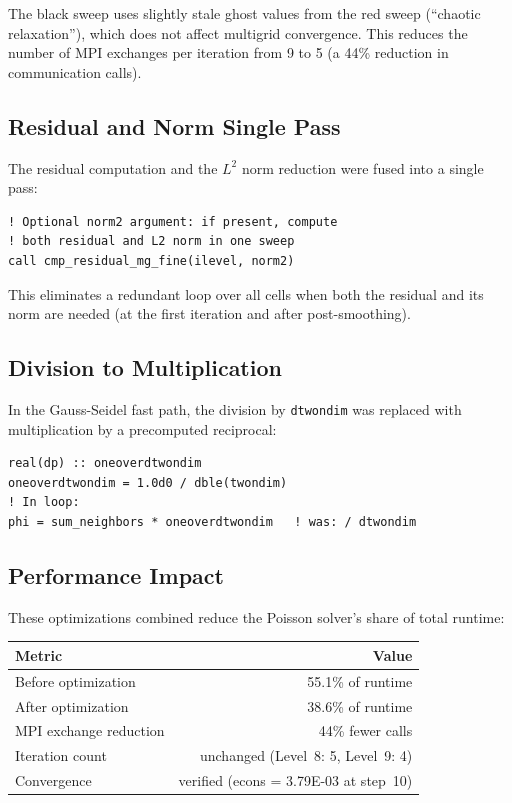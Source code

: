 \documentclass[11pt,fleqn]{book}
\begin{document}
The black sweep uses slightly stale ghost values from the red sweep (``chaotic relaxation''), which does not affect multigrid convergence. This reduces the number of MPI exchanges per iteration from 9 to 5 (a 44\% reduction in communication calls).

\subsection{Residual and Norm Single Pass}

The residual computation and the $L^2$ norm reduction were fused into a single pass:

\begin{lstlisting}[style=fortran,numbers=none]
! Optional norm2 argument: if present, compute
! both residual and L2 norm in one sweep
call cmp_residual_mg_fine(ilevel, norm2)
\end{lstlisting}

This eliminates a redundant loop over all cells when both the residual and its norm are needed (at the first iteration and after post-smoothing).

\subsection{Division to Multiplication}

In the Gauss-Seidel fast path, the division by \texttt{dtwondim} was replaced with multiplication by a precomputed reciprocal:

\begin{lstlisting}[style=fortran,numbers=none]
real(dp) :: oneoverdtwondim
oneoverdtwondim = 1.0d0 / dble(twondim)
! In loop:
phi = sum_neighbors * oneoverdtwondim   ! was: / dtwondim
\end{lstlisting}

\subsection{Performance Impact}

These optimizations combined reduce the Poisson solver's share of total runtime:

\begin{center}
\begin{tabular}{lr}
\toprule
\textbf{Metric} & \textbf{Value} \\
\midrule
Before optimization & 55.1\% of runtime \\
After optimization & 38.6\% of runtime \\
MPI exchange reduction & 44\% fewer calls \\
Iteration count & unchanged (Level~8: 5, Level~9: 4) \\
Convergence & verified (econs = 3.79E-03 at step~10) \\
\bottomrule
\end{tabular}
\end{center}
\end{document}
